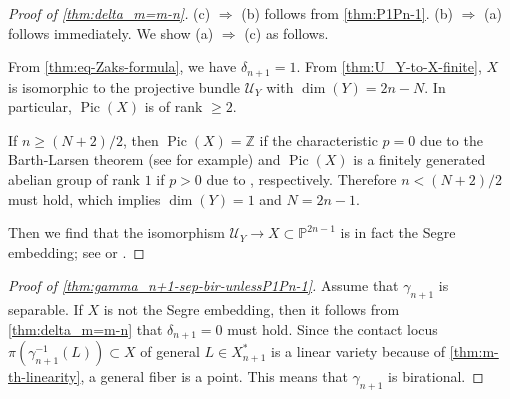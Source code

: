 \documentclass[a4paper,12pt]{amsart}
\theoremstyle{plain}
\theoremstyle{definition}
\begin{document}
\begin{proof}[Proof of \autoref{thm:delta_m=m-n}]
  (c) $\Rightarrow$ (b) follows from \autoref{thm:P1Pn-1}.
  (b) $ \Rightarrow $ (a) follows immediately.
  We show (a) $ \Rightarrow $ (c) as follows.

  From \autoref{thm:eq-Zaks-formula}, we have $\delta_{n+1} = 1$.
  From \autoref{thm:U_Y-to-X-finite},
  $X$ is isomorphic to the projective bundle ${\mathcal {U}}_Y$ with $\dim(Y) = 2n-N$.
  In particular, $\operatorname{Pic}(X)$ is of rank ${\geqslant} 2$.

  If $n {\geqslant} (N+2)/2$, then $\operatorname{Pic}(X) = {\mathbb{Z}}$ if the characteristic $p=0$ due to the Barth-Larsen theorem (see \cite[Corollary 3.2.3]{Laz} for example)
  and $\operatorname{Pic}(X)$ is a finitely generated abelian group of rank $1$
  if $p > 0$ due to \cite[Theorem~(3.1)]{Speiser}, respectively.
  Therefore $n < (N+2)/2$ must hold, which implies $\dim(Y) = 1$ and $N=2n-1$.

  Then we find that the isomorphism
  ${\mathcal {U}}_Y \rightarrow X \subset {\mathbb{P}}^{2n-1}$
  is in fact the Segre embedding;
  see 
  \cite[pp. 307--308]{Kleiman1982} or
  \cite[Proposition 3.1]{SIERRA}.
\end{proof}

\begin{proof}[Proof of \autoref{thm:gamma_n+1-sep-bir-unlessP1Pn-1}]
  Assume that $\gamma_{n+1}$ is separable.
  If $X$ is not the Segre embedding, then it follows from
  \autoref{thm:delta_m=m-n} that $\delta_{n+1} = 0$ must hold.
  Since the contact locus $\pi(\gamma_{n+1}^{-1}(L)) \subset X$ of general $L \in X_{n+1}^*$ is a linear variety because of \autoref{thm:m-th-linearity}, a general fiber is a point.
  This means that $\gamma_{n+1}$ is birational.
\end{proof}
\end{document}
